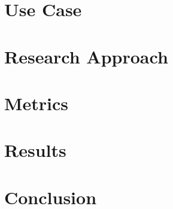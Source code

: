 \documentclass{acm_proc_article-sp}
\begin{document}
\section{Use Case}

\section{Research Approach}

\section{Metrics}

\section{Results}

\section{Conclusion}



\end{document}
